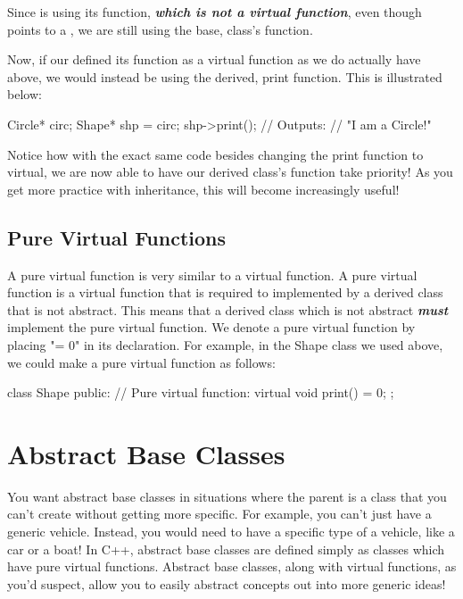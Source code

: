 \documentclass{tufte-handout}
\begin{document}
Since  is using its  function, \textit{\textbf{which is not a virtual function}}, even though  points to a , we are still using the base,  class's  function.

Now, if our  defined its  function as a virtual function as we do actually have above, we would instead be using the derived,  print function.
This is illustrated below:

\begin{Code}
    Circle* circ;
    Shape* shp = circ;
    shp->print();
    // Outputs:
    // "I am a Circle!"
\end{Code}
Notice how with the exact same code besides changing the print function to virtual, we are now able to have our derived class's function take priority!
As you get more practice with inheritance, this will become increasingly useful!

\subsection{Pure Virtual Functions}
A pure virtual function is very similar to a virtual function.
A pure virtual function is a virtual function that is required to implemented by a derived class that is not abstract.
This means that a derived class which is not abstract \textbf{\textit{must}} implement the pure virtual function. We denote a pure virtual function by placing "= 0" in its declaration. For example, in the Shape class we used above, we could make  a pure virtual function as follows:
\begin{Code}
class Shape{
    public:
        // Pure virtual function:
        virtual void print() = 0;
};
\end{Code}

\section{Abstract Base Classes}
You want abstract base classes in situations where the parent is a class that you can't create without getting more specific.
For example, you can't just have a generic vehicle.
Instead, you would need to have a specific type of a vehicle, like a car or a boat!
In C++, abstract base classes are defined simply as classes which have pure virtual functions.
Abstract base classes, along with virtual functions, as you'd suspect, allow you to easily abstract concepts out into more generic ideas!
\end{document}
